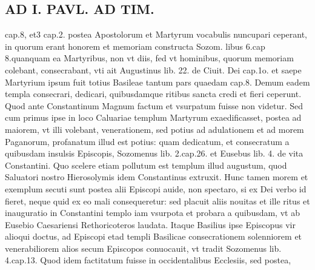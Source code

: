 \documentclass{article}
\begin{document}
\begin{pages}
\section*{AD I. PAVL. AD TIM. }
\marginpar{[ p.72 ]}\pstart cap.8, et3 cap.2. postea Apostolorum et Martyrum vocabulis nuncupari ceperant, in quorum erant honorem et memoriam constructa Sozom. libus  6.cap 8.quanquam ea Martyribus, non vt diis, fed vt hominibus, quorum memoriam colebant, consecrabant, vti ait Augustinus lib. 22. de Ciuit. Dei cap.1o. et saepe Martyrium ipsum fuit totius Basileae tantum pars quaedam cap.8. Demum eadem templa consecrari, dedicari, quibusdamque ritibus sancta credi et fieri ceperunt. Quod ante Constantinum Magnum factum et vsurpatum fuisse non videtur. Sed cum primus ipse in loco Caluariae templum Martyrum exaedificasset, postea ad maiorem, vt illi volebant, venerationem, sed potius ad adulationem et ad morem Paganorum, profanatum illud est potius: quam dedicatum, et consecratum a quibusdam insulsis Episcopis, Sozomenus lib. 2.cap.26. et Eusebus lib. 4. de vita Constantini. Quo scelere etiam pollutum est templum illud augustum, quod Saluatori nostro Hierosolymis idem Constantinus extruxit. Hunc tamen morem et exemplum secuti sunt postea alii Episcopi auide, non spectaro, si ex Dei verbo id fieret, neque quid ex eo mali consequeretur: sed placuit aliis nouitas et ille ritus et inauguratio in Constantini templo iam vsurpota et probara a quibusdam, vt ab Eusebio Caesariensi Rethoricoteros laudata. Itaque Basilius ipse Episcopus vir alioqui doctus, ad Episcopi etad templi Basilicae consecrationem solenniorem et venerabiliorem alios secum Episcopos conuocauit, vt tradit Sozomenus lib. 4.cap.13. Quod idem factitatum fuisse in occidentalibus Ecclesiis, sed postea,  \pend

\end{pages}
\end{document}
